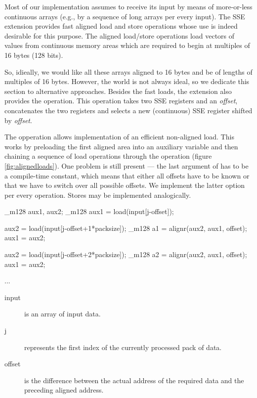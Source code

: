 Most of our implementation assumes to receive its input by means of more-or-less continuous arrays (e.g., by a sequence of long arrays per every input). The SSE extension provides fast aligned load and store operations whose use is indeed desirable for this purpose. The aligned load/store operations load vectors of values from continuous memory areas which are required to begin at multiples of 16 bytes (128 bits). 

So, idieally, we would like all these arrays aligned to 16 bytes and be of lengths of multiples of 16 bytes. However, the world is not always ideal, so we dedicate this section to alternative approaches. Besides the fast loads, the extension also provides the  operation. This operation takes two SSE registers and an \emph{offset}, concatenates the two registers and selects a new (continuous) SSE register shifted by \emph{offset}. 

The  opperation allows implementation of an efficient non-aligned load. This works by preloading the first aligned area into an auxiliary variable and then chaining a sequence of load operations through the  operation (figure \ref{fig:alignedloads}). One problem is still present --- the last argument of  has to be a compile-time constant, which means that either all offsets have to be known or that we have to switch over all possible offsets. We implement the latter option per every operation. Stores may be implemented analogically.

\mybeginfig
\begin{code}
_m128 aux1, aux2;
_m128 aux1 = load(input[j-offset]);

aux2 = load(input[j-offset+1*packsize]);
_m128 a1 = alignr(aux2, aux1, offset);
aux1 = aux2;

aux2 = load(input[j-offset+2*packsize]);
_m128 a2 = alignr(aux2, aux1, offset);
aux1 = aux2;

...
\end{code}
\begin{description}
  \item[input] is an array of input data.
  \item[j] represents the first index of the currently processed pack of data.
  \item[offset] is the difference between the actual address of the required data and the preceding aligned address.
\end{description}


